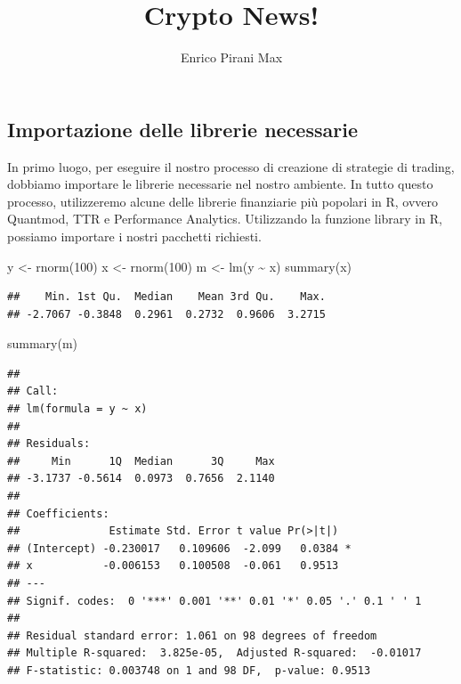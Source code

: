 \documentclass[]{tufte-handout}
\title[Una Newsletter sull'andamento delle crypto]{Crypto News!}
\author{Enrico Pirani Max}
\date{}
\newenvironment{Shaded}{}{}
\newcommand{\DecValTok}[1]{\textcolor[rgb]{0.25,0.63,0.44}{#1}}
\newcommand{\FunctionTok}[1]{\textcolor[rgb]{0.02,0.16,0.49}{#1}}
\newcommand{\NormalTok}[1]{#1}
\newcommand{\OtherTok}[1]{\textcolor[rgb]{0.00,0.44,0.13}{#1}}
\newcommand{\SpecialCharTok}[1]{\textcolor[rgb]{0.25,0.44,0.63}{#1}}
\begin{document}
\maketitle




\hypertarget{importazione-delle-librerie-necessarie}{%
\subsection{Importazione delle librerie
necessarie}\label{importazione-delle-librerie-necessarie}}

In primo luogo, per eseguire il nostro processo di creazione di
strategie di trading, dobbiamo importare le librerie necessarie nel
nostro ambiente. In tutto questo processo, utilizzeremo alcune delle
librerie finanziarie più popolari in R, ovvero Quantmod, TTR e
Performance Analytics. Utilizzando la funzione library in R, possiamo
importare i nostri pacchetti richiesti.

\begin{Shaded}
\begin{Highlighting}[]
\NormalTok{y }\OtherTok{\textless{}{-}} \FunctionTok{rnorm}\NormalTok{(}\DecValTok{100}\NormalTok{)}
\NormalTok{x }\OtherTok{\textless{}{-}} \FunctionTok{rnorm}\NormalTok{(}\DecValTok{100}\NormalTok{)}
\NormalTok{m }\OtherTok{\textless{}{-}} \FunctionTok{lm}\NormalTok{(y }\SpecialCharTok{\textasciitilde{}}\NormalTok{ x)}
\FunctionTok{summary}\NormalTok{(x)}
\end{Highlighting}
\end{Shaded}

\begin{verbatim}
##    Min. 1st Qu.  Median    Mean 3rd Qu.    Max. 
## -2.7067 -0.3848  0.2961  0.2732  0.9606  3.2715
\end{verbatim}

\begin{Shaded}
\begin{Highlighting}[]
\FunctionTok{summary}\NormalTok{(m)}
\end{Highlighting}
\end{Shaded}

\begin{verbatim}
## 
## Call:
## lm(formula = y ~ x)
## 
## Residuals:
##     Min      1Q  Median      3Q     Max 
## -3.1737 -0.5614  0.0973  0.7656  2.1140 
## 
## Coefficients:
##              Estimate Std. Error t value Pr(>|t|)  
## (Intercept) -0.230017   0.109606  -2.099   0.0384 *
## x           -0.006153   0.100508  -0.061   0.9513  
## ---
## Signif. codes:  0 '***' 0.001 '**' 0.01 '*' 0.05 '.' 0.1 ' ' 1
## 
## Residual standard error: 1.061 on 98 degrees of freedom
## Multiple R-squared:  3.825e-05,  Adjusted R-squared:  -0.01017 
## F-statistic: 0.003748 on 1 and 98 DF,  p-value: 0.9513
\end{verbatim}
\end{document}
